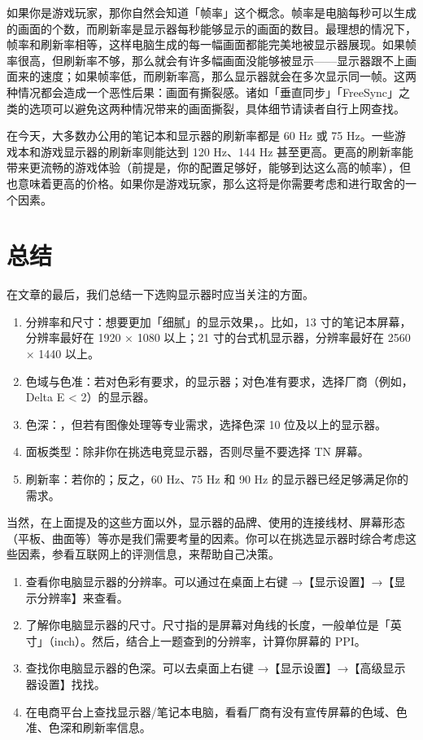 如果你是游戏玩家，那你自然会知道「帧率」这个概念。帧率是电脑每秒可以生成的画面的个数，而刷新率是显示器每秒能够显示的画面的数目。最理想的情况下，帧率和刷新率相等，这样电脑生成的每一幅画面都能完美地被显示器展现。如果帧率很高，但刷新率不够，那么就会有许多幅画面没能够被显示——显示器跟不上画面来的速度；如果帧率低，而刷新率高，那么显示器就会在多次显示同一帧。这两种情况都会造成一个恶性后果：画面有撕裂感。诸如「垂直同步」「FreeSync」之类的选项可以避免这两种情况带来的画面撕裂，具体细节请读者自行上网查找。

在今天，大多数办公用的笔记本和显示器的刷新率都是 60 Hz 或 75 Hz。一些游戏本和游戏显示器的刷新率则能达到 120 Hz、144 Hz 甚至更高。更高的刷新率能带来更流畅的游戏体验（前提是，你的配置足够好，能够到达这么高的帧率），但也意味着更高的价格。如果你是游戏玩家，那么这将是你需要考虑和进行取舍的一个因素。

\section{总结}

在文章的最后，我们总结一下选购显示器时应当关注的方面。

\begin{enumerate}
  \item 分辨率和尺寸：想要更加「细腻」的显示效果，。比如，13 寸的笔记本屏幕，分辨率最好在 1920 × 1080 以上；21 寸的台式机显示器，分辨率最好在 2560 × 1440 以上。
  \item 色域与色准：若对色彩有要求，的显示器；对色准有要求，选择厂商（例如，Delta E < 2）的显示器。
  \item 色深：，但若有图像处理等专业需求，选择色深 10 位及以上的显示器。
  \item 面板类型：除非你在挑选电竞显示器，否则尽量不要选择 TN 屏幕。
  \item 刷新率：若你的；反之，60 Hz、75 Hz 和 90 Hz 的显示器已经足够满足你的需求。
\end{enumerate}

当然，在上面提及的这些方面以外，显示器的品牌、使用的连接线材、屏幕形态（平板、曲面等）等亦是我们需要考量的因素。你可以在挑选显示器时综合考虑这些因素，参看互联网上的评测信息，来帮助自己决策。

\practice

\begin{enumerate}
  \item 查看你电脑显示器的分辨率。可以通过在桌面上右键 →【显示设置】→【显示分辨率】来查看。
  \item 了解你电脑显示器的尺寸。尺寸指的是屏幕对角线的长度，一般单位是「英寸」（inch）。然后，结合上一题查到的分辨率，计算你屏幕的 PPI。
  \item 查找你电脑显示器的色深。可以去桌面上右键 →【显示设置】→【高级显示器设置】找找。
  \item 在电商平台上查找显示器/笔记本电脑，看看厂商有没有宣传屏幕的色域、色准、色深和刷新率信息。
\end{enumerate}